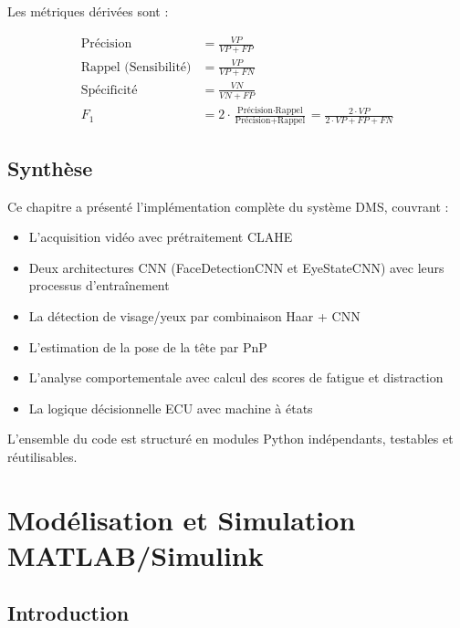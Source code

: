 \documentclass[12pt,a4paper,twoside]{report}
\begin{document}
Les métriques dérivées sont :

\begin{align}
\text{Précision} &= \frac{VP}{VP + FP} \label{eq:precision} \\
\text{Rappel (Sensibilité)} &= \frac{VP}{VP + FN} \label{eq:recall} \\
\text{Spécificité} &= \frac{VN}{VN + FP} \label{eq:specificity} \\
F_1 &= 2 \cdot \frac{\text{Précision} \cdot \text{Rappel}}{\text{Précision} + \text{Rappel}} = \frac{2 \cdot VP}{2 \cdot VP + FP + FN} \label{eq:f1}
\end{align}

\section{Synthèse}

Ce chapitre a présenté l'implémentation complète du système DMS, couvrant :
\begin{itemize}
    \item L'acquisition vidéo avec prétraitement CLAHE
    \item Deux architectures CNN (FaceDetectionCNN et EyeStateCNN) avec leurs processus d'entraînement
    \item La détection de visage/yeux par combinaison Haar + CNN
    \item L'estimation de la pose de la tête par PnP
    \item L'analyse comportementale avec calcul des scores de fatigue et distraction
    \item La logique décisionnelle ECU avec machine à états
\end{itemize}

L'ensemble du code est structuré en modules Python indépendants, testables et réutilisables.


\chapter{Modélisation et Simulation MATLAB/Simulink}

\section{Introduction}
\end{document}
